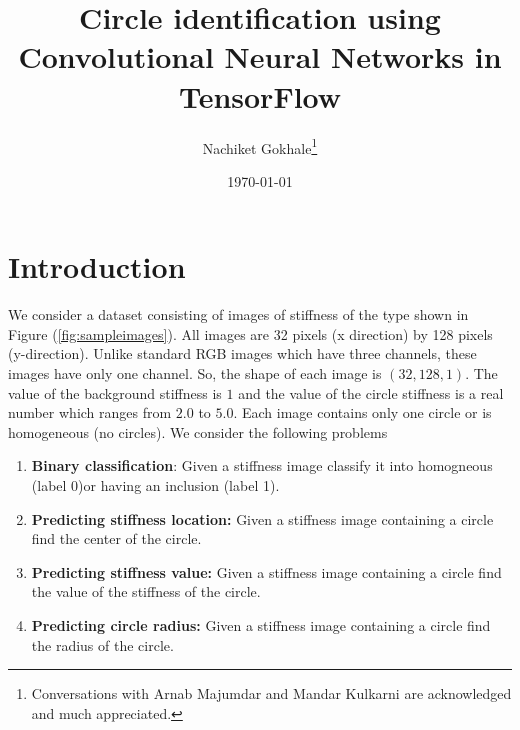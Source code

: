 \documentclass{article}
\begin{document}
\title{Circle identification using Convolutional Neural Networks in TensorFlow}
\author{Nachiket Gokhale\footnote{Conversations with Arnab Majumdar and Mandar Kulkarni are acknowledged and much appreciated.}}
\date{\today}
\maketitle
\section{Introduction}
We consider a dataset consisting of images of stiffness of the type shown in Figure (\ref{fig:sampleimages}). All images are 32 pixels (x direction) by 128 pixels (y-direction). Unlike standard RGB images which have three channels, these images have only one channel. So, the shape of each image is $(32,128,1)$. The value of the background stiffness is $1$ and the value of the circle stiffness is a real number which ranges from $2.0$ to $5.0$. Each image contains only one circle or is homogeneous (no circles). We consider the following problems
\begin{enumerate}
\item{\textbf{Binary classification}: Given a stiffness image classify it into homogneous (label 0)or having an inclusion (label 1).}
\item{\textbf{Predicting stiffness location:} Given a stiffness image containing a circle find the center of the circle.}
\item{\textbf{Predicting stiffness value:} Given a stiffness image containing a circle find the value of the stiffness of the circle.}
\item{\textbf{Predicting circle radius:} Given a stiffness image containing a circle find the radius of the circle.}
\end{enumerate}
\end{document}
